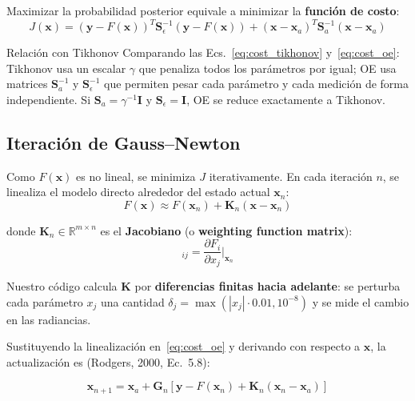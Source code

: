 \documentclass[a4paper,11pt]{article}
\begin{document}
Maximizar la probabilidad posterior equivale a minimizar la \textbf{funci\'on
de costo}:
\begin{equation}\label{eq:cost_oe}
    \boxed{J(\mathbf{x}) = (\mathbf{y}-F(\mathbf{x}))^T\mathbf{S}_\epsilon^{-1}(\mathbf{y}-F(\mathbf{x}))
    + (\mathbf{x}-\mathbf{x}_a)^T\mathbf{S}_a^{-1}(\mathbf{x}-\mathbf{x}_a)}
\end{equation}

\begin{concept}{Relaci\'on con Tikhonov}
Comparando las Ecs.~\eqref{eq:cost_tikhonov} y~\eqref{eq:cost_oe}: Tikhonov
usa un escalar $\gamma$ que penaliza todos los par\'ametros por igual; OE usa
matrices $\mathbf{S}_a^{-1}$ y $\mathbf{S}_\epsilon^{-1}$ que permiten pesar
cada par\'ametro y cada medici\'on de forma independiente.  Si
$\mathbf{S}_a = \gamma^{-1}\mathbf{I}$ y $\mathbf{S}_\epsilon = \mathbf{I}$,
OE se reduce exactamente a Tikhonov.
\end{concept}

\subsection{Iteraci\'on de Gauss--Newton}

Como $F(\mathbf{x})$ es no lineal, se minimiza $J$ iterativamente.  En cada
iteraci\'on $n$, se linealiza el modelo directo alrededor del estado actual
$\mathbf{x}_n$:
\begin{equation}
    F(\mathbf{x}) \approx F(\mathbf{x}_n) + \mathbf{K}_n(\mathbf{x}-\mathbf{x}_n)
\end{equation}

donde $\mathbf{K}_n \in \mathbb{R}^{m \times n}$ es el \textbf{Jacobiano}
(o \textbf{weighting function matrix}):
\begin{equation}
    [\mathbf{K}_n]_{ij} = \frac{\partial F_i}{\partial x_j}\bigg|_{\mathbf{x}_n}
\end{equation}

Nuestro c\'odigo calcula $\mathbf{K}$ por \textbf{diferencias finitas
hacia adelante}: se perturba cada par\'ametro $x_j$ una cantidad
$\delta_j = \max(|x_j| \cdot 0.01, 10^{-8})$ y se mide el cambio en las
radiancias.

Sustituyendo la linealizaci\'on en~\eqref{eq:cost_oe} y derivando con
respecto a $\mathbf{x}$, la actualizaci\'on es (Rodgers, 2000, Ec.~5.8):

\begin{equation}\label{eq:oe_update}
    \boxed{\mathbf{x}_{n+1} = \mathbf{x}_a + \mathbf{G}_n\left[
    \mathbf{y} - F(\mathbf{x}_n) + \mathbf{K}_n(\mathbf{x}_n - \mathbf{x}_a)
    \right]}
\end{equation}
\end{document}

